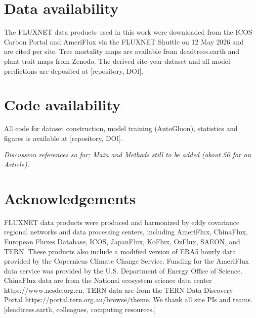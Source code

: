 \documentclass[11pt,a4paper]{article}
\begin{document}
\section*{Data availability}
The FLUXNET data products used in this work were downloaded from the ICOS Carbon Portal and AmeriFlux via the FLUXNET Shuttle on
12 May 2026 and are cited per site\cite{flxATMmg,flxATZoe,flxAUAPL,flxAUHow,flxBEBra,flxBEMaa,flxBEVie,flxCALU2,flxCATP1,flxCATP3,flxCATPD,flxCHDav,flxCHLae,flxCLACF,flxCLSDP,flxCNBeO,flxCNDzo,flxCZBK1,flxCZLnz,flxCZRAJ,flxCZStn,flxDEAkm,flxDEHai,flxDEHar,flxDEHoH,flxDEHzd,flxDEMsr,flxDEObe,flxDERuC,flxDETha,flxDKGds,flxDKSor,flxEEStg,flxESCrg,flxESHen,flxFIHyy,flxFIKen,flxFILet,flxFIRk2,flxFRBil,flxFRFBn,flxFRFon,flxFRPue,flxILYat,flxITBFt,flxITBsB,flxITCp2,flxITLav,flxITNoe,flxITRen,flxITSR2,flxJPApi,flxJPYms,flxJPYnf,flxKRKw1,flxKRKw2,flxNLLoo,flxRUFy2,flxRUFyo,flxSEHtm,flxSENor,flxSERos,flxSESvb,flxUSBZo,flxUSBar,flxUSCMW,flxUSCRK,flxUSCS2,flxUSGLE,flxUSHB2,flxUSHB3,flxUSHBK,flxUSMBP,flxUSMOz,flxUSMtB,flxUSNC2,flxUSNC3,flxUSRRC,flxUSRpf,flxUSSHC,flxUSSSH,flxUSUMd,flxUSVcp,flxUSxAB,flxUSxBL,flxUSxBN,flxUSxBR,flxUSxDJ,flxUSxDL,flxUSxGR,flxUSxJE,flxUSxML,flxUSxRM,flxUSxRN,flxUSxSC,flxUSxSE,flxUSxST,flxUSxTR,flxUSxUK,flxUSxUN,flxUSxWR}. Tree mortality maps are available from deadtrees.earth\cite{mosig2025deadtrees}
and plant trait maps from Zenodo\cite{lusk2026crowdsourced}. The derived site-year dataset and all model predictions are deposited
at [repository, DOI].

\section*{Code availability}
All code for dataset construction, model training (AutoGluon), statistics and figures is available at
[repository, DOI].

\renewcommand{\refname}{References}
{\small\textit{Discussion references so far; Main and Methods still to be added (about 50 for an Article).}}



\section*{Acknowledgements}
FLUXNET data products were produced and harmonized by eddy covariance regional networks and data processing centers,
including AmeriFlux, ChinaFlux, European Fluxes Database, ICOS, JapanFlux, KoFlux, OzFlux, SAEON, and TERN. These products also
include a modified version of ERA5 hourly data provided by the Copernicus Climate Change Service. Funding for the AmeriFlux data
service was provided by the U.S. Department of Energy Office of Science. ChinaFlux data are from the National ecosystem science
data center https://www.nesdc.org.cn. TERN data are from the TERN Data Discovery Portal https://portal.tern.org.au/browse/theme.
We thank all site PIs and teams. [deadtrees.earth, colleagues, computing resources.]
\end{document}
